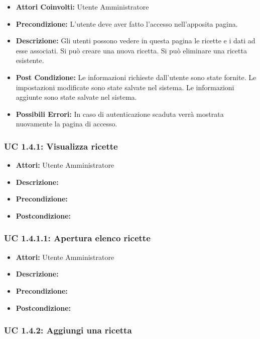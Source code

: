 \begin{itemize}
\item \textbf{Attori Coinvolti:}
Utente Amministratore

\item \textbf{Precondizione:}
L’utente deve aver fatto l’accesso nell’apposita pagina.

\item \textbf{Descrizione:}
Gli utenti possono vedere in questa pagina le ricette e i dati ad esse associati.  
Si può creare una nuova ricetta. 
Si può eliminare una ricetta esistente.

\item \textbf{Post Condizione:}
Le informazioni richieste dall'utente sono state fornite.
Le impostazioni modificate sono state salvate nel sistema.
Le informazioni aggiunte sono state salvate nel sistema.

\item \textbf{Possibili Errori:}
In caso di autenticazione scaduta verrà mostrata nuovamente la pagina di accesso.
\end{itemize}

\subsubsection{UC 1.4.1: Visualizza ricette}

\begin{itemize}
\item \textbf{Attori:} Utente Amministratore
\item \textbf{Descrizione:} 
\item \textbf{Precondizione:} 
\item \textbf{Postcondizione:} 
\end{itemize}

\subsubsection{UC 1.4.1.1: Apertura elenco ricette}

\begin{itemize}
\item \textbf{Attori:} Utente Amministratore
\item \textbf{Descrizione:} 
\item \textbf{Precondizione:} 
\item \textbf{Postcondizione:} 
\end{itemize}

\subsubsection{UC 1.4.2: Aggiungi una ricetta}

